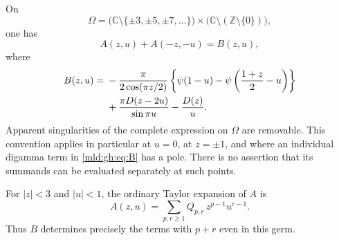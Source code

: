\begin{theorem}\label{mld:gh:thm:reflection}
On
\[
 \Omega=
 \bigl(\mathbb C\setminus\{\pm3,\pm5,\pm7,\ldots\}\bigr)
 \times\bigl(\mathbb C\setminus(\mathbb Z\setminus\{0\})\bigr),
\]
one has
\begin{equation}\label{mld:gh:eq:reflection}
 \boxed{A(z,u)+A(-z,-u)=B(z,u),}
\end{equation}
where
\begin{align}
 B(z,u)={}&-\frac{\pi}{2\cos(\pi z/2)}
   \left\{\psi(1-u)-\psi\left(\frac{1+z}{2}-u\right)\right\}
       \notag\\
 &+\frac{\pi D(z-2u)}{\sin\pi u}-\frac{D(z)}{u}.
       \label{mld:gh:eq:B}
\end{align}
Apparent singularities of the complete expression on $\Omega$ are
removable. This convention applies in particular at $u=0$, at $z=\pm1$,
and where an individual digamma term in \eqref{mld:gh:eq:B} has a pole.
There is no assertion that its summands can be evaluated separately
at such points.

For $|z|<3$ and $|u|<1$, the ordinary Taylor expansion of $A$ is
\begin{equation}\label{mld:gh:eq:Agenerating}
 A(z,u)=\sum_{p,r\geq1} Q_{p,r}\,z^{p-1}u^{r-1}.
\end{equation}
Thus $B$ determines precisely the terms with $p+r$ even in this germ.
\end{theorem}

